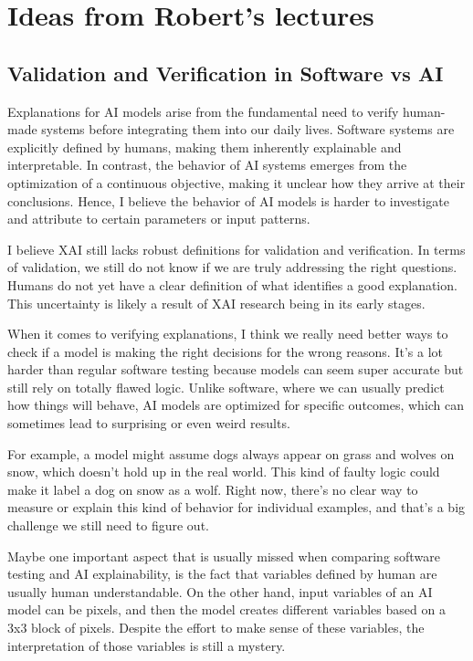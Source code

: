 \section{Ideas from Robert's lectures}

\subsection{Validation and Verification in Software vs AI}
Explanations for AI models arise from the fundamental need to verify human-made systems before integrating them into our daily lives. 
Software systems are explicitly defined by humans, making them inherently explainable and interpretable. 
In contrast, the behavior of AI systems emerges from the optimization of a continuous objective, making it unclear how they arrive at their conclusions.
Hence, I believe the behavior of AI models is harder to investigate and attribute to certain parameters or input patterns.




I believe XAI still lacks robust definitions for validation and verification. 
In terms of validation, we still do not know if we are truly addressing the right questions. 
Humans do not yet have a clear definition of what identifies a good explanation. 
This uncertainty is likely a result of XAI research being in its early stages.



When it comes to verifying explanations, I think we really need better ways to check if a model is making the right decisions for the wrong reasons. It’s a lot harder than regular software testing because models can seem super accurate but still rely on totally flawed logic. Unlike software, where we can usually predict how things will behave, AI models are optimized for specific outcomes, which can sometimes lead to surprising or even weird results.



For example, a model might assume dogs always appear on grass and wolves on snow, which doesn’t hold up in the real world. This kind of faulty logic could make it label a dog on snow as a wolf. Right now, there’s no clear way to measure or explain this kind of behavior for individual examples, and that’s a big challenge we still need to figure out.



Maybe one important aspect that is usually missed when comparing software testing and AI explainability, is the fact that variables defined by human are usually human understandable. On the other hand, input variables of an AI model can be pixels, and then the model creates different variables based on a 3x3 block of pixels. Despite the effort to make sense of these variables, the interpretation of those variables is still a mystery.


